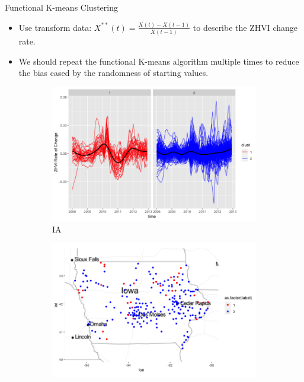 \documentclass[final]{beamer}
\newlength{\colwidth}
\begin{document}
\begin{frame}[t]
\begin{columns}[t]
\begin{column}{\colwidth}
  \vspace{-1em}
  \begin{block}{Functional K-means Clustering}
\begin{itemize}
\item Use transform data: $X^{**}(t) = \frac{X(t) - X(t-1)}{X(t-1)}$ to describe the ZHVI change rate.
\item We should repeat the functional K-means algorithm multiple times to reduce the bias cased by 
the randomness of starting values.
\end{itemize}

  \vspace{-1em}
\begin{figure}[h]
  \begin{subfigure}{0.5\textwidth}
    \centering
    \includegraphics[width=1.05\linewidth]{figure/clust_IA_c.png}
    \caption{IA}
  \end{subfigure}%
    \begin{subfigure}{0.5\textwidth}
    \centering
    \includegraphics[width=1.05\linewidth]{figure/clust_IA_s.png}

\end{subfigure}
\end{figure}
\end{block}
\end{column}
\end{columns}
\end{frame}
\end{document}
